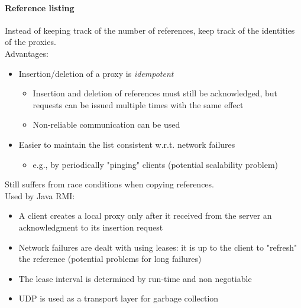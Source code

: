 \documentclass[10pt,a4paper]{article}
\begin{document}
\paragraph{Reference listing}
Instead of keeping track of the number of references, keep track of the identities of the proxies. \\
Advantages:
\begin{itemize}
	\item Insertion/deletion of a proxy is \textit{idempotent}
	\begin{itemize}
		\item Insertion and deletion of references must still be acknowledged, but requests can be issued multiple times with the same effect
		\item Non-reliable communication can be used
	\end{itemize}
	\item Easier to maintain the list consistent w.r.t. network failures
	\begin{itemize}
		\item e.g., by periodically "pinging" clients (potential scalability problem)
	\end{itemize}
\end{itemize}
Still suffers from race conditions when copying references. \\
Used by Java RMI:
\begin{itemize}
	\item A client creates a local proxy only after it received from the server an acknowledgment to its insertion request
	\item Network failures are dealt with using leases: it is up to the client to "refresh" the reference (potential problems for long failures)
	\item The lease interval is determined by run-time and non negotiable
	\item UDP is used as a transport layer for garbage collection
\end{itemize}
\end{document}
